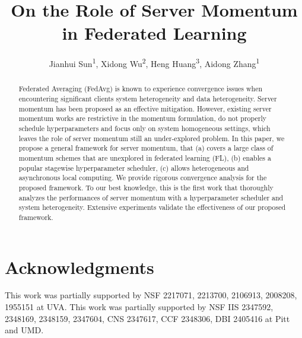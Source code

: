 \documentclass[letterpaper]{article} %
\title{On the Role of Server Momentum in Federated Learning}
\author{
    Jianhui Sun\textsuperscript{\rm 1}\equalcontrib,
    Xidong Wu\textsuperscript{\rm 2}\equalcontrib,
    Heng Huang\textsuperscript{\rm 3},
    Aidong Zhang\textsuperscript{\rm 1}
}
\theoremstyle{theorem}
\theoremstyle{definition}
\theoremstyle{remark}
\begin{document}
\maketitle

\begin{abstract}
Federated Averaging (FedAvg) is known to experience convergence issues when encountering significant clients system heterogeneity and data heterogeneity. Server momentum has been proposed as an effective mitigation. However, existing server momentum works are restrictive in the momentum formulation, do not properly schedule hyperparameters and focus only on system homogeneous settings, which leaves the role of server momentum still an under-explored problem. In this paper, we propose a general framework for server momentum, that (a) covers a large class of momentum schemes that are unexplored in federated learning (FL), (b) enables a popular stagewise hyperparameter scheduler, (c) allows heterogeneous and asynchronous local computing. We provide rigorous convergence analysis for the proposed framework. To our best knowledge, this is the first work that thoroughly analyzes the performances of server momentum with a hyperparameter scheduler and system heterogeneity. Extensive experiments validate the effectiveness of our proposed framework.
\end{abstract}









\section{Acknowledgments}
This work was partially supported by NSF 2217071, 2213700, 2106913, 2008208, 1955151 at UVA.
This work was partially supported by NSF IIS 2347592, 2348169, 2348159, 2347604, CNS 2347617, CCF 2348306, DBI 2405416 at Pitt and UMD.



\newpage





\newpage
\onecolumn
\appendix

\end{document}
